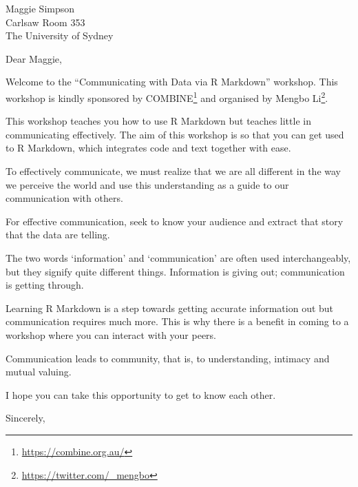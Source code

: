 \documentclass[11pt,]{letter}
\date{4th October 2019}
\renewcommand{\href}[2]{#2\footnote{\url{#1}}}
\renewenvironment{quote}{\begin{blockquote}\list{}{\rightmargin=0em\leftmargin=0em}%
\item\relax\color{greytext}\ignorespaces}{\unskip\unskip\endlist\end{blockquote}}
\begin{document}
\begin{letter}{Maggie Simpson\\
Carlsaw Room 353\\
The University of Sydney\\}
\opening{Dear Maggie,}

Welcome to the ``Communicating with Data via R Markdown'' workshop. This
workshop is kindly sponsored by \href{https://combine.org.au/}{COMBINE}
and organised by \href{https://twitter.com/_mengbo}{Mengbo Li}.

This workshop teaches you how to use R Markdown but teaches little in
communicating effectively. The aim of this workshop is so that you can
get used to R Markdown, which integrates code and text together with
ease.

\begin{quote}
To effectively communicate, we must realize that we are all different in
the way we perceive the world and use this understanding as a guide to
our communication with others.
\end{quote}

For effective communication, seek to know your audience and extract that
story that the data are telling.

\begin{quote}
The two words `information' and `communication' are often used
interchangeably, but they signify quite different things. Information is
giving out; communication is getting through.
\end{quote}

Learning R Markdown is a step towards getting accurate information out
but communication requires much more. This is why there is a benefit in
coming to a workshop where you can interact with your peers.

\begin{quote}
Communication leads to community, that is, to understanding, intimacy
and mutual valuing.
\end{quote}

I hope you can take this opportunity to get to know each other.

\longindentation=0pt
\closing{Sincerely,}

\end{letter}
\end{document}
